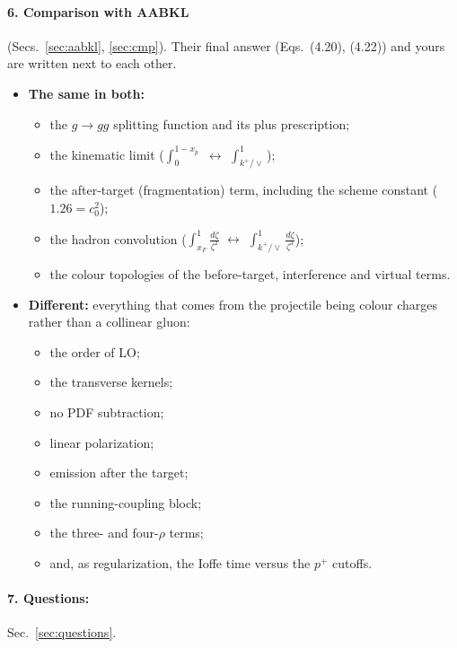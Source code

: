 \documentclass[10pt]{article}
\numberwithin{equation}{section}
\begin{document}
\paragraph{6. Comparison with AABKL} (Secs.~\ref{sec:aabkl}, \ref{sec:cmp}). Their final answer (Eqs.~(4.20), (4.22)) and yours are written next to each other.
\begin{itemize}
\item \textbf{The same in both:}
\begin{itemize}
\item the $g\to gg$ splitting function and its plus prescription;
\item the kinematic limit ($\int_0^{1-x_p}$ $\leftrightarrow$ $\int_{k^+/\vee}^1$);
\item the after-target (fragmentation) term, including the scheme constant ($1.26=c_0^2$);
\item the hadron convolution ($\int_{x_F}^1\frac{d\zeta}{\zeta^2}$ $\leftrightarrow$ $\int_{k^+/\vee}^1\frac{d\zeta}{\zeta^3}$);
\item the colour topologies of the before-target, interference and virtual terms.
\end{itemize}
\item \textbf{Different:} everything that comes from the projectile being colour charges rather than a collinear gluon:
\begin{itemize}
\item the order of LO;
\item the transverse kernels;
\item no PDF subtraction;
\item linear polarization;
\item emission after the target;
\item the running-coupling block;
\item the three- and four-$\rho$ terms;
\item and, as regularization, the Ioffe time versus the $p^+$ cutoffs.
\end{itemize}
\end{itemize}

\paragraph{7. Questions:} Sec.~\ref{sec:questions}.

\end{document}
